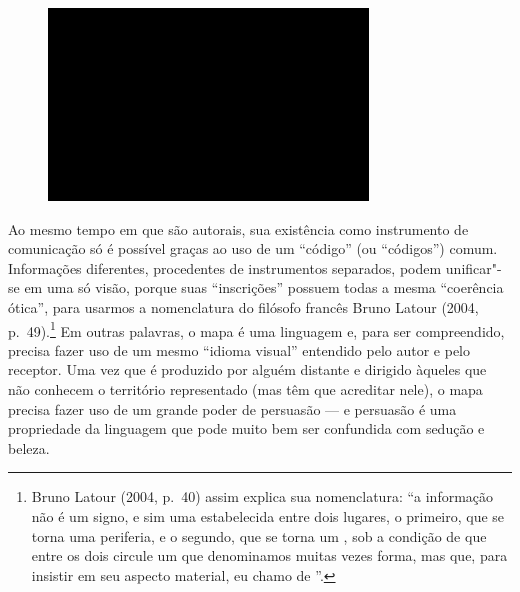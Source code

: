 \begin{figure}[!ht]

\centering
 \includegraphics[width=85mm]{./imgs/im1.jpg}
\caption{\tiny{}}

\end{figure}

Ao mesmo tempo em que são autorais, sua existência como instrumento de
comunicação só é possível graças ao uso de um ``código'' (ou
``códigos'') comum. Informações diferentes, procedentes de instrumentos
separados, podem unificar"-se em uma só visão, porque suas ``inscrições''
possuem todas a mesma ``coerência ótica'', para usarmos a nomenclatura
do filósofo francês Bruno Latour (2004, p.~49).\footnote{Bruno Latour
  (2004, p.~40) assim explica sua nomenclatura: ``a informação não é um
  signo, e sim uma {} estabelecida entre dois lugares, o
  primeiro, que se torna uma periferia, e o segundo, que se torna um
  {}, sob a condição de que entre os dois circule um
  {} que denominamos muitas vezes forma, mas que, para
  insistir em seu aspecto material, eu chamo de {}''.} Em
outras palavras, o mapa é uma linguagem e, para ser compreendido,
precisa fazer uso de um mesmo ``idioma visual'' entendido pelo autor e
pelo receptor. Uma vez que é produzido por alguém distante e dirigido
àqueles que não conhecem o território representado (mas têm que
acreditar nele), o mapa precisa fazer uso de um grande poder de
persuasão --- e persuasão é uma propriedade da linguagem que pode muito
bem ser confundida com sedução e beleza.

